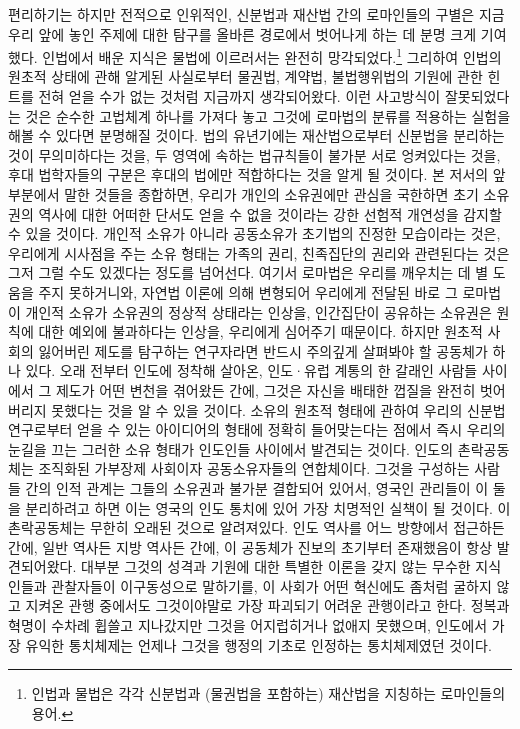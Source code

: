 편리하기는 하지만 전적으로 인위적인,
신분법과 재산법 간의
로마인들의 구별은
지금 우리 앞에 놓인 주제에 대한 탐구를 올바른 경로에서
벗어나게 하는 데 분명 크게 기여했다.
인법에서 배운 지식은
물법에 이르러서는 완전히 망각되었다.\footnote{%
  인법과 물법은 각각 신분법과 (물권법을 포함하는) 재산법을 지칭하는
  로마인들의 용어.
  }
그리하여
인법의 원초적 상태에 관해 알게된 사실로부터
물권법, 계약법, 불법행위법의 기원에 관한 힌트를 전혀 얻을 수가 없는 것처럼
지금까지 생각되어왔다.
이런 사고방식이 잘못되었다는 것은
순수한 고법체계 하나를 가져다 놓고
그것에 로마법의 분류를 적용하는 실험을 해볼 수 있다면
분명해질 것이다.
법의 유년기에는
재산법으로부터 신분법을 분리하는 것이 무의미하다는 것을,
두 영역에 속하는 법규칙들이 불가분 서로 엉켜있다는 것을,
후대 법학자들의 구분은 후대의 법에만 적합하다는 것을
알게 될 것이다.
본 저서의 앞 부분에서 말한 것들을 종합하면,
우리가 개인의 소유권에만 관심을 국한하면
초기 소유권의 역사에 대한 어떠한 단서도 얻을 수 없을 것이라는
강한 선험적 개연성을 감지할 수 있을 것이다.
개인적 소유가 아니라 공동소유가 초기법의 진정한 모습이라는 것은,
우리에게 시사점을 주는 소유 형태는 가족의 권리, 친족집단의 권리와
관련된다는 것은 그저 그럴 수도 있겠다는 정도를 넘어선다.
여기서 로마법은 우리를 깨우치는 데 별 도움을 주지 못하거니와,
자연법 이론에 의해 변형되어
우리에게 전달된 바로 그 로마법이
개인적 소유가 소유권의 정상적 상태라는 인상을,
인간집단이 공유하는 소유권은 원칙에 대한 예외에 불과하다는 인상을,
우리에게 심어주기 때문이다.
하지만 원초적 사회의 잃어버린 제도를 탐구하는 연구자라면
반드시 주의깊게 살펴봐야 할 공동체가 하나 있다.
오래 전부터 인도에 정착해 살아온,
인도^^b7유럽 계통의 한 갈래인 사람들 사이에서
그 제도가
어떤 변천을 겪어왔든 간에,
그것은
자신을 배태한 껍질을 완전히 벗어버리지 못했다는 것을 알 수 있을 것이다.
소유의 원초적 형태에 관하여
우리의 신분법 연구로부터
얻을 수 있는
아이디어의
형태에 정확히 들어맞는다는 점에서
즉시
우리의 눈길을 끄는 그러한 소유 형태가
인도인들 사이에서
발견되는 것이다.
인도의 촌락공동체는 조직화된 가부장제 사회이자
공동소유자들의 연합체이다.
그것을 구성하는 사람들 간의 인적 관계는
그들의 소유권과 불가분 결합되어 있어서,
영국인 관리들이 이 둘을 분리하려고 하면 이는
영국의 인도 통치에 있어 가장 치명적인 실책이 될 것이다.
이 촌락공동체는 무한히 오래된 것으로 알려져있다.
인도 역사를 어느 방향에서 접근하든 간에,
일반 역사든 지방 역사든 간에,
이 공동체가 진보의 초기부터 존재했음이 항상 발견되어왔다.
대부분 그것의 성격과 기원에 대한 특별한 이론을 갖지 않는
무수한 지식인들과 관찰자들이
이구동성으로 말하기를,
이 사회가
어떤 혁신에도 좀처럼 굴하지 않고 지켜온 관행 중에서도
그것이야말로 가장 파괴되기 어려운 관행이라고 한다.
정복과 혁명이 수차례 휩쓸고 지나갔지만
그것을 어지럽히거나 없애지 못했으며,
인도에서 가장 유익한 통치체제는 언제나
그것을 행정의 기초로 인정하는 통치체제였던 것이다.


